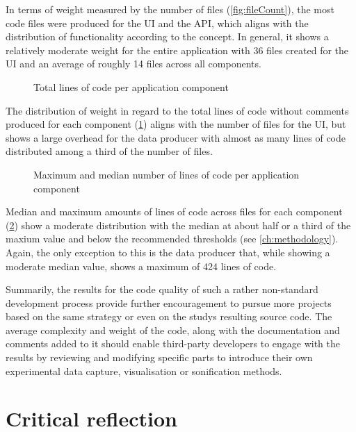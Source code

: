 In terms of weight measured by the number of files (\ref{fig:fileCount}), the most code files were produced for the \ac{UI} and the \ac{API}, which aligns with the distribution of functionality according to the concept. In general, it shows a relatively moderate weight for the entire application with 36 files created for the \ac{UI} and an average of roughly 14 files across all components.

\begin{figure}[h]
\centering

\caption[Lines of code (total)]{Total lines of code per application component\protect}
\label{fig:linesOfCodeTotal}
\end{figure}

The distribution of weight in regard to the total lines of code without comments produced for each component (\ref{fig:linesOfCodeTotal}) aligns with the number of files for the \ac{UI}, but shows a large overhead for the data producer with almost as many lines of code distributed among a third of the number of files.

\begin{figure}[h]
\centering

\caption[Lines of code]{Maximum and median number of lines of code per application component\protect}
\label{fig:linesOfCode}
\end{figure}

Median and maximum amounts of lines of code across files for each component (\ref{fig:linesOfCode}) show a moderate distribution with the median at about half or a third of the maxium value and below the recommended thresholds (see \autoref{ch:methodology}).
Again, the only exception to this is the data producer that, while showing a moderate median value, shows a maximum of 424 lines of code.

Summarily, the results for the code quality of such a rather non-standard development process provide further encouragement to pursue more projects based on the same strategy or even on the study\textquotesingle s resulting source code.
The average complexity and weight of the code, along with the documentation and comments added to it should enable third-party developers to engage with the results by reviewing and modifying specific parts to introduce their own experimental data capture, visualisation or sonification methods.

\section{Critical reflection}
\label{sec:critical-reflection}

